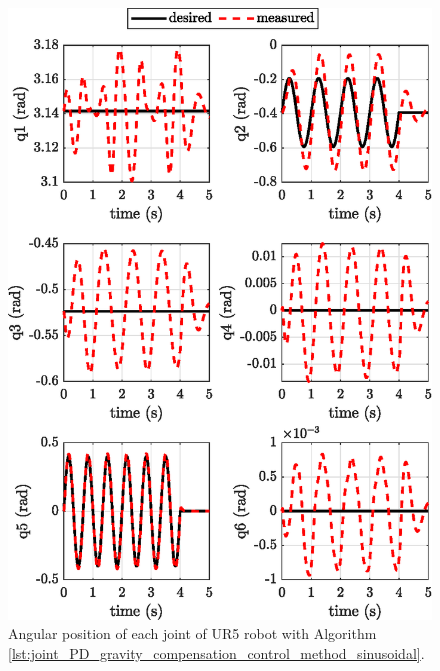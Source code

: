 \begin{figure}[H]
	\centering
	\includegraphics{images/act_1.6_sin/joint_position.eps}
	\caption{Angular position of each joint of UR5 robot with Algorithm \ref{lst:joint_PD_gravity_compensation_control_method_sinusoidal}.}
	\label{fig:act_1.6_sin_joint_position}
\end{figure}

